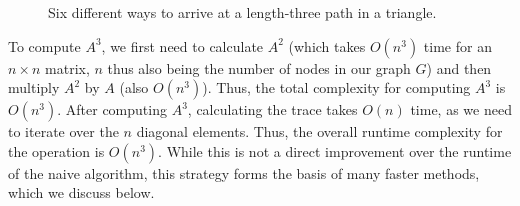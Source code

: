 \documentclass[11pt, margin=1in]{article}
\begin{document}
\begin{figure}[H]
\begin{subfigure}{0.15\textwidth}
    \end{subfigure}
    \begin{subfigure}{0.15\textwidth}
        \centering
    \end{subfigure}
    \begin{subfigure}{0.15\textwidth}
        \centering
    \end{subfigure}
    \caption{Six different ways to arrive at a length-three path in a triangle.}
    \label{fig:triangle-traversal}
\end{figure}

To compute $A^3$, we first need to calculate $A^2$ (which takes $O(n^3)$ time for an $n \times n$ matrix, $n$ thus also being the number of nodes in our graph $G$) and then multiply $A^2$ by $A$ (also $O(n^3)$).
Thus, the total complexity for computing $A^3$ is $O(n^3)$.
After computing $A^3$, calculating the trace takes $O(n)$ time, as we need to iterate over the $n$ diagonal elements.
Thus, the overall runtime complexity for the operation is $O(n^3)$.
While this is not a direct improvement over the runtime of the naive algorithm, this strategy forms the basis of many faster methods, which we discuss below.
\end{document}
